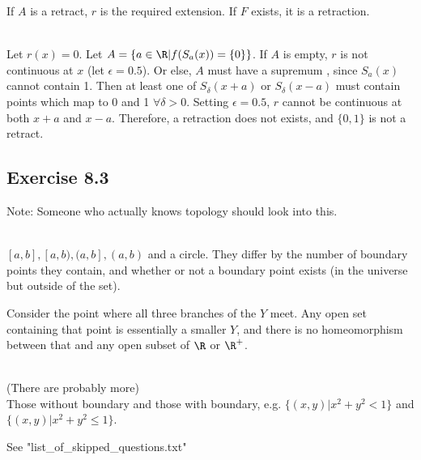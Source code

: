 \begin{solution}
 If $A$ is a retract, $r$ is the required extension. If $F$ exists, it is a retraction.
\end{solution}


\begin{solution}
 \\Let $r(x) = 0$. Let $A = \{a \in \R|f(S_a(x)) = \{0\}\}$. If $A$ is empty, $r$ is not continuous at $x$ (let $\epsilon = 0.5$). Or else, $A$ must have a supremum , since $S_a(x)$ cannot contain 1. Then at least one of $S_\delta(x+a)$ or $S_\delta(x-a)$ must contain points which map to 0 and 1 $\forall \delta > 0$. Setting $\epsilon = 0.5$, $r$ cannot be continuous at both $x+a$ and $x-a$. Therefore, a retraction does not exists, and $\{0,1\}$ is not a retract.
\end{solution}

\subsection{Exercise 8.3}
\setcounter{question}{0}

Note: Someone who actually knows topology should look into this.


\begin{solution}
 \\$[a,b], [a,b), (a,b], (a,b)$ and a circle. They differ by the number of boundary points they contain, and whether or not a boundary point exists (in the universe but outside of the set).
\end{solution}


\begin{solution}
 Consider the point where all three branches of the $Y$ meet. Any open set containing that point is essentially a smaller $Y$, and there is no homeomorphism between that and any open subset of $\R$ or $\R^+$.
\end{solution}


\begin{solution}
 \\(There are probably more) \\
 Those without boundary and those with boundary, e.g. $\{(x,y)|x^2 + y^2 < 1\}$ and $\{(x,y)|x^2 + y^2 \leq 1\}$.
\end{solution}


\begin{solution}
See "list_of_skipped_questions.txt"
\end{solution}
